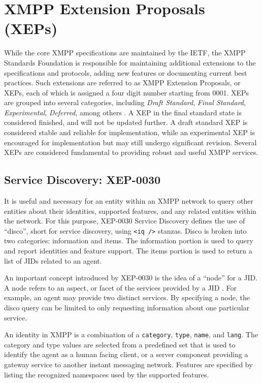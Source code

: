 \section{XMPP Extension Proposals (XEPs)}
\label{sec:XEPs}

While the core XMPP specifications are maintained by the IETF, the XMPP
Standards Foundation is responsible for maintaining additional extensions to
the specifications and protocols, adding new features or documenting current
best practices. Such extensions are referred to as XMPP Extension Proposals,
or XEPs, each of which is assigned a four digit number starting from 0001.
XEPs are grouped into several categories, including \textit{Draft Standard},
\textit{Final Standard}, \textit{Experimental}, \textit{Deferred}, among others
\cite{XEP-0001}. A XEP in the final standard state is considered finished,
and will not be updated further. A draft standard XEP is considered stable
and reliable for implementation, while an experimental XEP is encouraged for
implementation but may still undergo significant revision. Several XEPs are
considered fundamental to providing robust and useful XMPP services.

\subsection{Service Discovery: XEP-0030}
\label{sec:Service-Discovery}

It is useful and necessary for an entity within an XMPP network to query other
entities about their identities, supported features, and any related entities
within the network. For this purpose, XEP-0030 Service Discovery \cite{XEP-0030}
defines the use of ``disco'', short for service discovery, using \texttt{<iq
/>} stanzas. Disco is broken into two categories: information and items. The
information portion is used to query and report identities and feature support.
The items portion is used to return a list of JIDs related to an agent.

An important concept introduced by XEP-0030 is the idea of a ``node'' for a
JID. A node refers to an aspect, or facet of the services provided by a JID
\cite{XEP-0030}. For example, an agent may provide two distinct services. By
specifying a node, the disco query can be limited to only requesting information
about one particular service.

An identity in XMPP is a combination of a \texttt{category}, \texttt{type},
\texttt{name}, and \texttt{lang}. The category and type values are selected from
a predefined set that is used to identify the agent as a human facing client,
or a server component providing a gateway service to another instant messaging
network. Features are specified by listing the recognized namespaces used by the
supported features.

